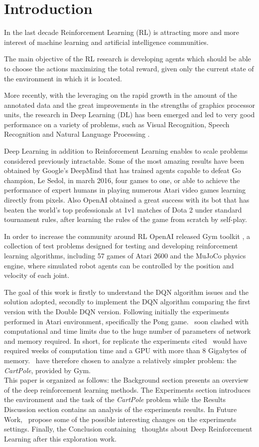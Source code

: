 \section{Introduction}

In the last decade Reinforcement Learning (RL) is attracting more and more interest of machine learning and artificial intelligence communities.

The main objective of the RL research is developing agents which should be able to choose the actions maximizing the total reward, given only the current state of the environment in which it is located.

More recently, with the leveraging on the rapid growth in the amount of the annotated data and the great improvements in the strengths of graphics processor units, the research in Deep Learning (DL) has been emerged and led to very good performance on a variety of problems, such as Visual Recognition, Speech Recognition and Natural Language Processing \cite{AdvancesCNN}.

Deep Learning in addition to Reinforcement Learning enables to scale problems considered previously intractable. Some of the most amazing results have been obtained by Google’s DeepMind that has trained agents capable to defeat Go champion, Le Sedol, in march 2016, four games to one, or able to achieve the performance of expert humans in playing numerous Atari video games learning directly from pixels. Also OpenAI obtained a great success with its bot that has beaten the world's top professionals at 1v1 matches of Dota 2 under standard tournament rules, after learning the rules of the game from scratch by self-play.

In order to increase the community around RL OpenAI released Gym toolkit \cite{Gym}, a collection of test problems designed for testing and developing reinforcement learning algorithms, including 57 games of Atari 2600 and the MuJoCo physics engine, where simulated robot agents can be controlled by the position and velocity of each joint. 

The goal of this work is firstly to understand the DQN algorithm issues and the solution adopted, secondly to implement the DQN algorithm comparing the first version with the Double DQN version. Following initially the experiments performed in Atari environment, specifically the Pong game. \Auth~soon clashed with computational and time limits due to the huge number of parameters of network and memory required. In short, for replicate the experiments cited \auth~would have required weeks of computation time and a GPU with more than 8 Gigabytes of memory. \Auth~have therefore chosen to analyze a relatively simpler problem: the \textit{CartPole}, provided by Gym.\\

This paper is organized as follows: the Background section presents an overview of the deep reinforcement learning methods. The Experiments section introduces the environment and the task of the \textit{CartPole} problem while the Results Discussion section contains an analysis of the experiments results. In Future Work, \auth~propose some of the possible interesting changes on the experiments settings. Finally, the Conclusion containing \authpp~thoughts about Deep Reinforcement Learning after this exploration work.
